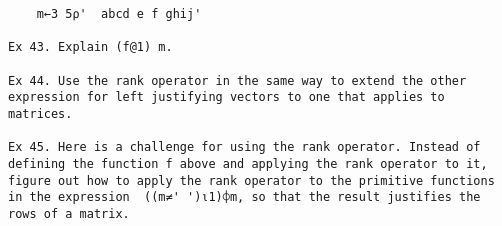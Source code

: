 \documentclass{article}
\begin{document}
\begin{verbatim}
	m←3 5⍴'  abcd e f ghij'                                              

Ex 43. Explain (f@1) m.                                               

Ex 44. Use the rank operator in the same way to extend the other      
expression for left justifying vectors to one that applies to         
matrices.                                                             

Ex 45. Here is a challenge for using the rank operator. Instead of    
defining the function f above and applying the rank operator to it,   
figure out how to apply the rank operator to the primitive functions  
in the expression  ((m≠' ')⍳1)⌽m, so that the result justifies the    
rows of a matrix.                                                     

\end{verbatim}
\end{document}
